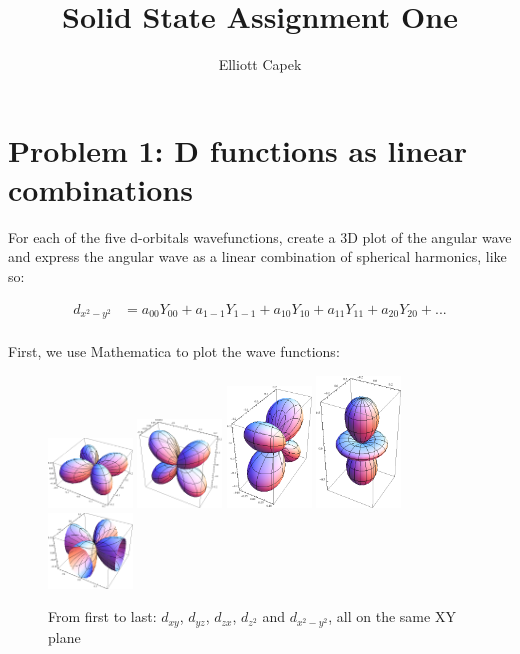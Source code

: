 \documentclass[10pt]{article} %
\title{Solid State Assignment One}
\author{Elliott Capek}
\begin{document}
\maketitle{}

\section{Problem 1: D functions as linear combinations}
For each of the five d-orbitals wavefunctions, create a 3D plot of the angular wave and express
the angular wave as a linear combination of spherical harmonics, like so:

\begin{align*}
  d_{x^2-y^2} &= a_{00}Y_{00} + a_{1-1}Y_{1-1} + a_{10}Y_{10} + a_{11}Y_{11} + a_{20}Y_{20} + ...\\
\end{align*}

First, we use Mathematica to plot the wave functions:

\begin{figure}[h!]
  \centering
  \includegraphics[width=0.2\textwidth]{../figures/dxy.png}
  \includegraphics[width=0.2\textwidth]{../figures/dyz.png}
  \includegraphics[width=0.2\textwidth]{../figures/dzx.png}
  \includegraphics[width=0.2\textwidth]{../figures/dz2.png}
  \includegraphics[width=0.2\textwidth]{../figures/dx2y2.png}
  \caption{From first to last: $d_{xy}$, $d_{yz}$, $d_{zx}$, $d_{z^2}$ and $d_{x^2-y^2}$, all on the same XY plane}
  \label{fig:dxy}
\end{figure}
\end{document}
